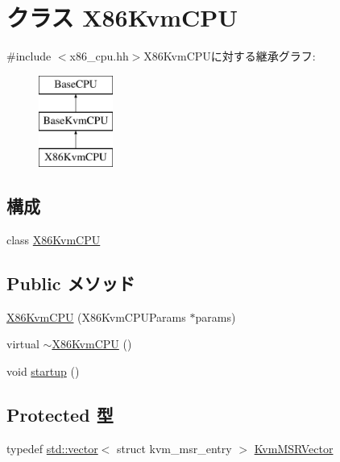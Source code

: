 \hypertarget{classX86KvmCPU}{
\section{クラス X86KvmCPU}
\label{classX86KvmCPU}
}


{\ttfamily \#include $<$x86\_\-cpu.hh$>$}X86KvmCPUに対する継承グラフ:\begin{figure}[H]
\begin{center}
\leavevmode
\includegraphics[height=3cm]{classX86KvmCPU}
\end{center}
\end{figure}
\subsection*{構成}
\begin{DoxyCompactItemize}
\item 
class \hyperlink{classX86KvmCPU_1_1X86KvmCPU}{X86KvmCPU}
\end{DoxyCompactItemize}
\subsection*{Public メソッド}
\begin{DoxyCompactItemize}
\item 
\hyperlink{classX86KvmCPU_a775cadafe573db795406b498b53cff43}{X86KvmCPU} (X86KvmCPUParams $\ast$params)
\item 
virtual \hyperlink{classX86KvmCPU_ad55c9b8bef2361530e30e7f3eb1a58c1}{$\sim$X86KvmCPU} ()
\item 
void \hyperlink{classX86KvmCPU_aecc7d8debf54990ffeaaed5bac7d7d81}{startup} ()
\end{DoxyCompactItemize}
\subsection*{Protected 型}
\begin{DoxyCompactItemize}
\item 
typedef \hyperlink{classstd_1_1vector}{std::vector}$<$ struct kvm\_\-msr\_\-entry $>$ \hyperlink{classX86KvmCPU_aa498445286177d1e3901b007c40f52c9}{KvmMSRVector}
\end{DoxyCompactItemize}
